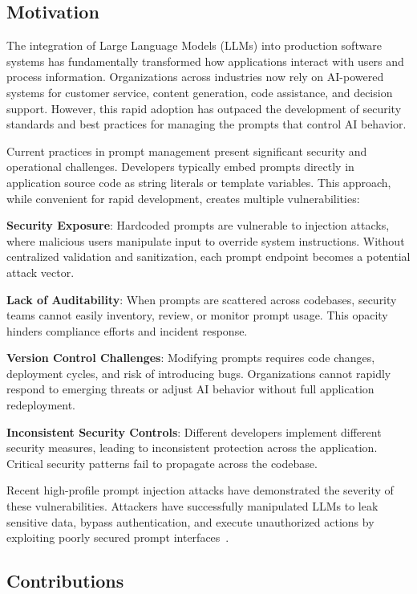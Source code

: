\subsection{Motivation}

The integration of Large Language Models (LLMs) into production software systems has fundamentally transformed how applications interact with users and process information. Organizations across industries now rely on AI-powered systems for customer service, content generation, code assistance, and decision support. However, this rapid adoption has outpaced the development of security standards and best practices for managing the prompts that control AI behavior.

Current practices in prompt management present significant security and operational challenges. Developers typically embed prompts directly in application source code as string literals or template variables. This approach, while convenient for rapid development, creates multiple vulnerabilities:

\textbf{Security Exposure}: Hardcoded prompts are vulnerable to injection attacks, where malicious users manipulate input to override system instructions. Without centralized validation and sanitization, each prompt endpoint becomes a potential attack vector.

\textbf{Lack of Auditability}: When prompts are scattered across codebases, security teams cannot easily inventory, review, or monitor prompt usage. This opacity hinders compliance efforts and incident response.

\textbf{Version Control Challenges}: Modifying prompts requires code changes, deployment cycles, and risk of introducing bugs. Organizations cannot rapidly respond to emerging threats or adjust AI behavior without full application redeployment.

\textbf{Inconsistent Security Controls}: Different developers implement different security measures, leading to inconsistent protection across the application. Critical security patterns fail to propagate across the codebase.

Recent high-profile prompt injection attacks have demonstrated the severity of these vulnerabilities. Attackers have successfully manipulated LLMs to leak sensitive data, bypass authentication, and execute unauthorized actions by exploiting poorly secured prompt interfaces~\cite{perez2022ignore, greshake2023more}.

\subsection{Contributions}

